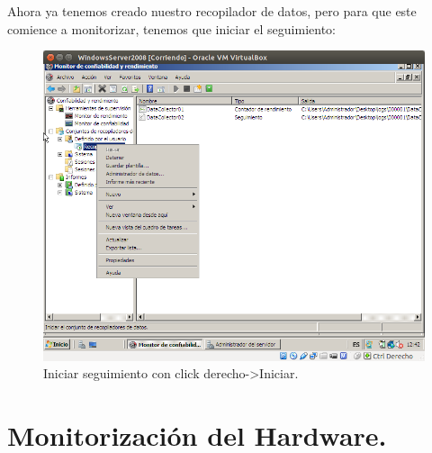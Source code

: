 \begin{itemize}
		Ahora ya tenemos creado nuestro recopilador de datos, pero para que este comience a monitorizar, tenemos que iniciar el seguimiento:\\
		\begin{figure}[H]
		\centering
		\includegraphics[width=0.6\linewidth]{seguimiento}
		\caption[Seguimiento]{Iniciar seguimiento con click derecho->Iniciar.}
		\label{fig:seguimiento}
		\end{figure}
		
\end{itemize}

\section{Monitorización del Hardware.}

